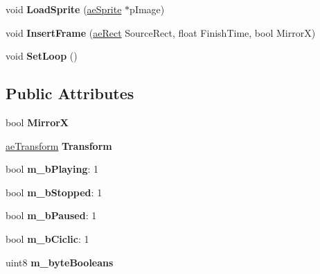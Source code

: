 \begin{DoxyCompactItemize}
\item 
void {\bfseries Load\+Sprite} (\hyperlink{classae_core_1_1ae_sprite}{ae\+Sprite} $\ast$p\+Image)\hypertarget{class_c_animation_a1329eb2c481deacc9e54de79eed31835}{}\label{class_c_animation_a1329eb2c481deacc9e54de79eed31835}

\item 
void {\bfseries Insert\+Frame} (\hyperlink{structae_core_1_1ae_rect}{ae\+Rect} Source\+Rect, float Finish\+Time, bool MirrorX)\hypertarget{class_c_animation_a8d680ab84ed93b983edc1590a615ca1f}{}\label{class_c_animation_a8d680ab84ed93b983edc1590a615ca1f}

\item 
void {\bfseries Set\+Loop} ()\hypertarget{class_c_animation_a5eda2aff89757540e931c60bec234b73}{}\label{class_c_animation_a5eda2aff89757540e931c60bec234b73}

\end{DoxyCompactItemize}
\subsection*{Public Attributes}
\begin{DoxyCompactItemize}
\item 
bool {\bfseries MirrorX}\hypertarget{class_c_animation_ad0050c1a4dedaf1317e097b1c5c62729}{}\label{class_c_animation_ad0050c1a4dedaf1317e097b1c5c62729}

\item 
\hyperlink{structae_transform}{ae\+Transform} {\bfseries Transform}\hypertarget{class_c_animation_a931bd21d64556382f1cece9c509daa12}{}\label{class_c_animation_a931bd21d64556382f1cece9c509daa12}

\item 
bool {\bfseries m\+\_\+b\+Playing}\+: 1\hypertarget{class_c_animation_aa20f91f7b79a8c6fd98eec1c09723364}{}\label{class_c_animation_aa20f91f7b79a8c6fd98eec1c09723364}

\item 
bool {\bfseries m\+\_\+b\+Stopped}\+: 1\hypertarget{class_c_animation_a77f35dc5b97d414333c3c545660befa6}{}\label{class_c_animation_a77f35dc5b97d414333c3c545660befa6}

\item 
bool {\bfseries m\+\_\+b\+Paused}\+: 1\hypertarget{class_c_animation_a53b5f0e2f3065b8bfa42528a5ea6af77}{}\label{class_c_animation_a53b5f0e2f3065b8bfa42528a5ea6af77}

\item 
bool {\bfseries m\+\_\+b\+Ciclic}\+: 1\hypertarget{class_c_animation_a569a669fae8be99846b754d7b7232b1c}{}\label{class_c_animation_a569a669fae8be99846b754d7b7232b1c}

\item 
uint8 {\bfseries m\+\_\+byte\+Booleans}\hypertarget{class_c_animation_a9100d670c1feba6e8bd279a9067a675e}{}\label{class_c_animation_a9100d670c1feba6e8bd279a9067a675e}

\end{DoxyCompactItemize}


